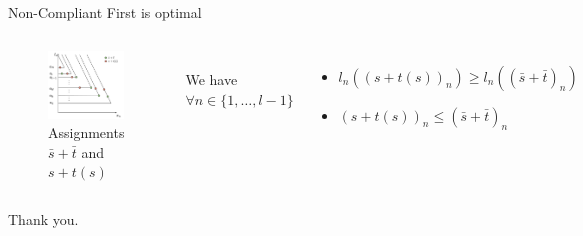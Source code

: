 \documentclass[xcolor=svgnames, english, smaller]{beamer}
\theoremstyle{plain}
\theoremstyle{definition}
\theoremstyle{plain}
\theoremstyle{plain}
\begin{document}
\begin{frame}{Non-Compliant First is optimal}

\begin{columns}[t]



\begin{figure}
\centering
\includegraphics[scale=0.25]{../../figures/presentation/optimal_stackelberg_proof4.png}
\caption{Assignments $\bar{s}+\bar{t}$ and $s+t(s)$}
\end{figure}


\\[.7in]
We have $\forall n \in \{1, \dots, l-1\}$

\begin{itemize}
\item $l_n((s+t(s))_n) \geq l_n((\bar{s}+\bar{t})_n)$
\item $(s+t(s))_n \leq (\bar{s}+\bar{t})_n$
\end{itemize}

\end{columns}

\end{frame}



\begin{frame}

\large
\begin{center}
Thank you.
\end{center}
\end{frame}
\end{document}
